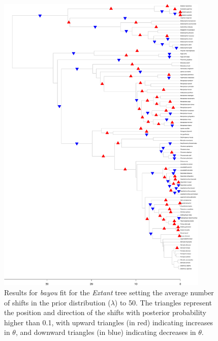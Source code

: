 \begin{figure}[H]
\includegraphics[width=0.9\textwidth]{img/plots-extant-k50-1.pdf}
\caption{Results for \textit{bayou} fit for the \textit{Extant} tree setting the average number of shifts in the prior distribution ($\lambda$) to 50. The triangles represent the position and direction of the shifts with posterior probability higher than 0.1, with upward triangles (in red) indicating increases in $\theta$, and downward triangles (in blue) indicating decreases in $\theta$.}
\label{fig:extant-k50}
\end{figure}

